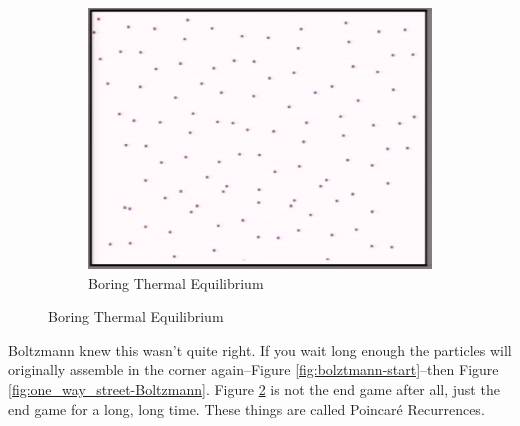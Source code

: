 \documentclass[]{article}
\begin{document}
\begin{figure}[H]
\begin{center}
		\;
		\begin{subfigure}[b]{0.3\textwidth}
			\caption{Boring Thermal Equilibrium}\label{fig:end-game-thermal-equilibrium}
			\includegraphics[width=\textwidth]{end-game-thermal-equilibrium}
		\end{subfigure}
	\end{center}
\end{figure}

Boltzmann knew this wasn't quite right. If you wait long enough the particles will originally assemble in the corner again--Figure \ref{fig:bolztmann-start}--then Figure \ref{fig:one_way_street-Boltzmann}. Figure \ref{fig:end-game-thermal-equilibrium} is not the end game after all, just the end game for a long, long time. These things are called Poincar\'e Recurrences. 
\end{document}
